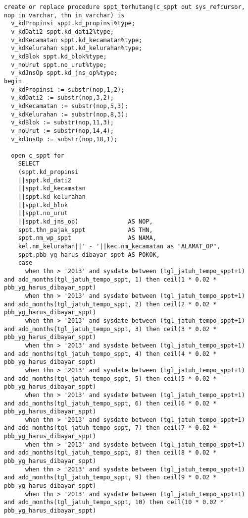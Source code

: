 \documentclass[pdftex,12pt, oneside]{article}
\begin{document}
  \begin{lstlisting}
create or replace procedure sppt_terhutang(c_sppt out sys_refcursor, nop in varchar, thn in varchar) is
  v_kdPropinsi sppt.kd_propinsi%type;
  v_kdDati2 sppt.kd_dati2%type;
  v_kdKecamatan sppt.kd_kecamatan%type;
  v_kdKelurahan sppt.kd_kelurahan%type;
  v_kdBlok sppt.kd_blok%type;
  v_noUrut sppt.no_urut%type;
  v_kdJnsOp sppt.kd_jns_op%type;
begin
  v_kdPropinsi := substr(nop,1,2);
  v_kdDati2 := substr(nop,3,2);
  v_kdKecamatan := substr(nop,5,3);
  v_kdKelurahan := substr(nop,8,3);
  v_kdBlok := substr(nop,11,3);
  v_noUrut := substr(nop,14,4);
  v_kdJnsOp := substr(nop,18,1);

  open c_sppt for
    SELECT
    (sppt.kd_propinsi
    ||sppt.kd_dati2
    ||sppt.kd_kecamatan
    ||sppt.kd_kelurahan
    ||sppt.kd_blok
    ||sppt.no_urut
    ||sppt.kd_jns_op)              AS NOP,
    sppt.thn_pajak_sppt            AS THN,
    sppt.nm_wp_sppt                AS NAMA,
    kel.nm_kelurahan||' - '||kec.nm_kecamatan as "ALAMAT_OP",
    sppt.pbb_yg_harus_dibayar_sppt AS POKOK,
    case
      when thn > '2013' and sysdate between (tgl_jatuh_tempo_sppt+1) and add_months(tgl_jatuh_tempo_sppt, 1) then ceil(1 * 0.02 * pbb_yg_harus_dibayar_sppt)
      when thn > '2013' and sysdate between (tgl_jatuh_tempo_sppt+1) and add_months(tgl_jatuh_tempo_sppt, 2) then ceil(2 * 0.02 * pbb_yg_harus_dibayar_sppt)
      when thn > '2013' and sysdate between (tgl_jatuh_tempo_sppt+1) and add_months(tgl_jatuh_tempo_sppt, 3) then ceil(3 * 0.02 * pbb_yg_harus_dibayar_sppt)
      when thn > '2013' and sysdate between (tgl_jatuh_tempo_sppt+1) and add_months(tgl_jatuh_tempo_sppt, 4) then ceil(4 * 0.02 * pbb_yg_harus_dibayar_sppt)
      when thn > '2013' and sysdate between (tgl_jatuh_tempo_sppt+1) and add_months(tgl_jatuh_tempo_sppt, 5) then ceil(5 * 0.02 * pbb_yg_harus_dibayar_sppt)
      when thn > '2013' and sysdate between (tgl_jatuh_tempo_sppt+1) and add_months(tgl_jatuh_tempo_sppt, 6) then ceil(6 * 0.02 * pbb_yg_harus_dibayar_sppt)
      when thn > '2013' and sysdate between (tgl_jatuh_tempo_sppt+1) and add_months(tgl_jatuh_tempo_sppt, 7) then ceil(7 * 0.02 * pbb_yg_harus_dibayar_sppt)
      when thn > '2013' and sysdate between (tgl_jatuh_tempo_sppt+1) and add_months(tgl_jatuh_tempo_sppt, 8) then ceil(8 * 0.02 * pbb_yg_harus_dibayar_sppt)
      when thn > '2013' and sysdate between (tgl_jatuh_tempo_sppt+1) and add_months(tgl_jatuh_tempo_sppt, 9) then ceil(9 * 0.02 * pbb_yg_harus_dibayar_sppt)
      when thn > '2013' and sysdate between (tgl_jatuh_tempo_sppt+1) and add_months(tgl_jatuh_tempo_sppt, 10) then ceil(10 * 0.02 * pbb_yg_harus_dibayar_sppt)

\end{lstlisting}
\end{document}
